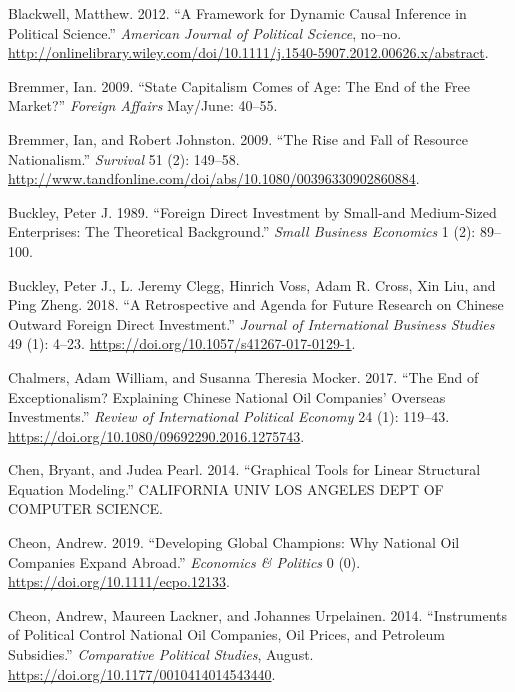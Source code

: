 \documentclass[11pt,]{book}
\begin{document}
\leavevmode\hypertarget{ref-blackwell_framework_2012}{}%
Blackwell, Matthew. 2012. ``A Framework for Dynamic Causal Inference in Political Science.'' \emph{American Journal of Political Science}, no--no. \url{http://onlinelibrary.wiley.com/doi/10.1111/j.1540-5907.2012.00626.x/abstract}.

\leavevmode\hypertarget{ref-bremmer_state_2009}{}%
Bremmer, Ian. 2009. ``State Capitalism Comes of Age: The End of the Free Market?'' \emph{Foreign Affairs} May/June: 40--55.

\leavevmode\hypertarget{ref-bremmer_rise_2009}{}%
Bremmer, Ian, and Robert Johnston. 2009. ``The Rise and Fall of Resource Nationalism.'' \emph{Survival} 51 (2): 149--58. \url{http://www.tandfonline.com/doi/abs/10.1080/00396330902860884}.

\leavevmode\hypertarget{ref-buckley_foreign_1989}{}%
Buckley, Peter J. 1989. ``Foreign Direct Investment by Small-and Medium-Sized Enterprises: The Theoretical Background.'' \emph{Small Business Economics} 1 (2): 89--100.

\leavevmode\hypertarget{ref-buckley_retrospective_2018}{}%
Buckley, Peter J., L. Jeremy Clegg, Hinrich Voss, Adam R. Cross, Xin Liu, and Ping Zheng. 2018. ``A Retrospective and Agenda for Future Research on Chinese Outward Foreign Direct Investment.'' \emph{Journal of International Business Studies} 49 (1): 4--23. \url{https://doi.org/10.1057/s41267-017-0129-1}.

\leavevmode\hypertarget{ref-chalmers_end_2017}{}%
Chalmers, Adam William, and Susanna Theresia Mocker. 2017. ``The End of Exceptionalism? Explaining Chinese National Oil Companies' Overseas Investments.'' \emph{Review of International Political Economy} 24 (1): 119--43. \url{https://doi.org/10.1080/09692290.2016.1275743}.

\leavevmode\hypertarget{ref-chen_graphical_2014}{}%
Chen, Bryant, and Judea Pearl. 2014. ``Graphical Tools for Linear Structural Equation Modeling.'' CALIFORNIA UNIV LOS ANGELES DEPT OF COMPUTER SCIENCE.

\leavevmode\hypertarget{ref-cheon_developing_2019}{}%
Cheon, Andrew. 2019. ``Developing Global Champions: Why National Oil Companies Expand Abroad.'' \emph{Economics \& Politics} 0 (0). \url{https://doi.org/10.1111/ecpo.12133}.

\leavevmode\hypertarget{ref-cheon_instruments_2014}{}%
Cheon, Andrew, Maureen Lackner, and Johannes Urpelainen. 2014. ``Instruments of Political Control National Oil Companies, Oil Prices, and Petroleum Subsidies.'' \emph{Comparative Political Studies}, August. \url{https://doi.org/10.1177/0010414014543440}.
\end{document}
